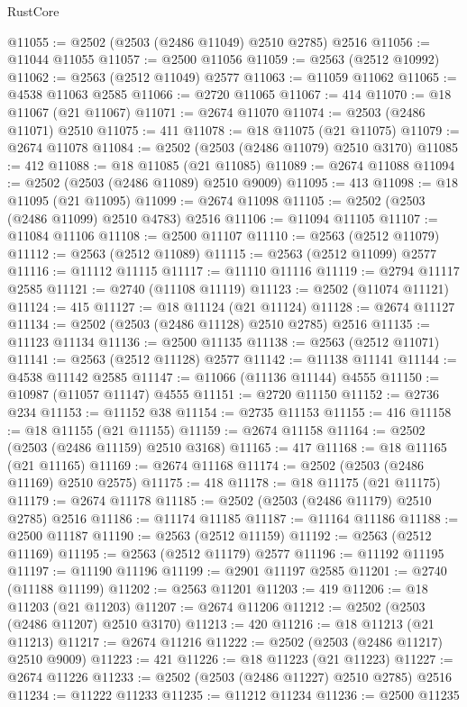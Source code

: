 \begin{lexlean}{RustCore}
\begin{coremodule}
@11055 := @2502 (@2503 (@2486 @11049) @2510 @2785) @2516
@11056 := @11044 @11055
@11057 := @2500 @11056
@11059 := @2563 (@2512 @10992)
@11062 := @2563 (@2512 @11049) @2577
@11063 := @11059 @11062
@11065 := @4538 @11063 @2585
@11066 := @2720 @11065
@11067 := 414
@11070 := @18 @11067 (@21 @11067)
@11071 := @2674 @11070
@11074 := @2503 (@2486 @11071) @2510
@11075 := 411
@11078 := @18 @11075 (@21 @11075)
@11079 := @2674 @11078
@11084 := @2502 (@2503 (@2486 @11079) @2510 @3170)
@11085 := 412
@11088 := @18 @11085 (@21 @11085)
@11089 := @2674 @11088
@11094 := @2502 (@2503 (@2486 @11089) @2510 @9009)
@11095 := 413
@11098 := @18 @11095 (@21 @11095)
@11099 := @2674 @11098
@11105 := @2502 (@2503 (@2486 @11099) @2510 @4783) @2516
@11106 := @11094 @11105
@11107 := @11084 @11106
@11108 := @2500 @11107
@11110 := @2563 (@2512 @11079)
@11112 := @2563 (@2512 @11089)
@11115 := @2563 (@2512 @11099) @2577
@11116 := @11112 @11115
@11117 := @11110 @11116
@11119 := @2794 @11117 @2585
@11121 := @2740 (@11108 @11119)
@11123 := @2502 (@11074 @11121)
@11124 := 415
@11127 := @18 @11124 (@21 @11124)
@11128 := @2674 @11127
@11134 := @2502 (@2503 (@2486 @11128) @2510 @2785) @2516
@11135 := @11123 @11134
@11136 := @2500 @11135
@11138 := @2563 (@2512 @11071)
@11141 := @2563 (@2512 @11128) @2577
@11142 := @11138 @11141
@11144 := @4538 @11142 @2585
@11147 := @11066 (@11136 @11144) @4555
@11150 := @10987 (@11057 @11147) @4555
@11151 := @2720 @11150
@11152 := @2736 @234
@11153 := @11152 @38
@11154 := @2735 @11153
@11155 := 416
@11158 := @18 @11155 (@21 @11155)
@11159 := @2674 @11158
@11164 := @2502 (@2503 (@2486 @11159) @2510 @3168)
@11165 := 417
@11168 := @18 @11165 (@21 @11165)
@11169 := @2674 @11168
@11174 := @2502 (@2503 (@2486 @11169) @2510 @2575)
@11175 := 418
@11178 := @18 @11175 (@21 @11175)
@11179 := @2674 @11178
@11185 := @2502 (@2503 (@2486 @11179) @2510 @2785) @2516
@11186 := @11174 @11185
@11187 := @11164 @11186
@11188 := @2500 @11187
@11190 := @2563 (@2512 @11159)
@11192 := @2563 (@2512 @11169)
@11195 := @2563 (@2512 @11179) @2577
@11196 := @11192 @11195
@11197 := @11190 @11196
@11199 := @2901 @11197 @2585
@11201 := @2740 (@11188 @11199)
@11202 := @2563 @11201
@11203 := 419
@11206 := @18 @11203 (@21 @11203)
@11207 := @2674 @11206
@11212 := @2502 (@2503 (@2486 @11207) @2510 @3170)
@11213 := 420
@11216 := @18 @11213 (@21 @11213)
@11217 := @2674 @11216
@11222 := @2502 (@2503 (@2486 @11217) @2510 @9009)
@11223 := 421
@11226 := @18 @11223 (@21 @11223)
@11227 := @2674 @11226
@11233 := @2502 (@2503 (@2486 @11227) @2510 @2785) @2516
@11234 := @11222 @11233
@11235 := @11212 @11234
@11236 := @2500 @11235

\end{coremodule}
\end{lexlean}
